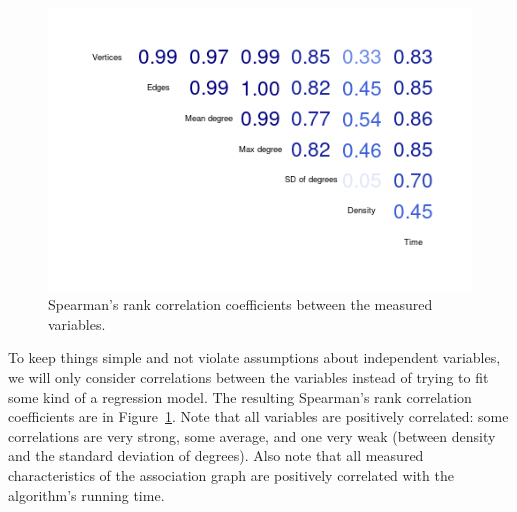 \documentclass{l4proj}
\theoremstyle{definition}
\theoremstyle{remark}
\begin{document}
\begin{figure}
  \centering
  \includegraphics[scale=0.5]{images/correlations.png}
  \caption{Spearman's rank correlation coefficients between the measured
    variables.}
  \label{fig:correlations}
\end{figure}

To keep things simple and not violate assumptions about independent variables,
we will only consider correlations between the variables instead of trying to
fit some kind of a regression model. The resulting Spearman's rank correlation
coefficients are in Figure~\ref{fig:correlations}. Note that all variables are
positively correlated: some correlations are very strong, some average, and one
very weak (between density and the standard deviation of degrees). Also note
that all measured characteristics of the association graph are positively
correlated with the algorithm's running time. 
\end{document}
